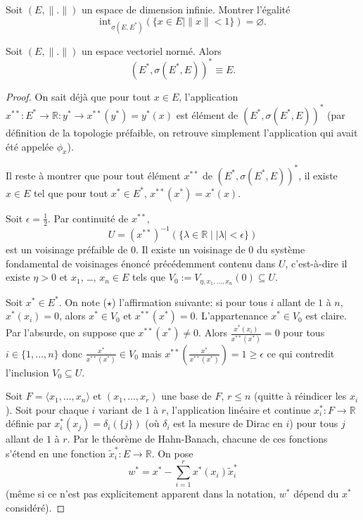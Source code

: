 \begin{exo}
  Soit $(E, \|.\|)$ un espace de dimension infinie. Montrer l'égalité
  $$\mathrm{int}_{\sigma(E, E^*)}(\{x\in E\mid \|x\|<1\})=\varnothing.$$
\end{exo}

\begin{prop}
  Soit $(E, \|.\|)$ un espace vectoriel normé. Alors
  $$(E^*, \sigma(E^*, E))^*\equiv E.$$
\end{prop}
\begin{proof}
  On sait déjà que pour tout $x\in E$, l'application
  $x^{**}: E^*\to \mathbb R: y^*\to x^{**}(y^*) = y^*(x)$ est
  élément de $(E^*, \sigma(E^*, E))^*$ (par définition de la
  topologie préfaible, on retrouve simplement l'application
  qui avait été appelée $\phi_x$).

  Il reste à montrer que pour tout élément $x^{**}$ de
  $(E^*, \sigma(E^*, E))^*$, il existe $x\in E$ tel que
  pour tout $x^*\in E^*$, $x^{**}(x^*) = x^*(x)$.

  Soit $\epsilon=\frac{1}{2}$. Par continuité de $x^{**}$,
  $$U = (x^{**})^{-1}\left(\{\lambda\in\mathbb R\mid
    |\lambda|<\epsilon\}\right)$$
  est un voisinage préfaible de $0$. Il existe un voisinage de $0$ du système
  fondamental de voisinages énoncé précédemment contenu dans $U$, c'est-à-dire
  il existe $\eta > 0$ et $x_1$,
  \ldots, $x_n\in E$ tels que $V_0:=V_{\eta, x_1, \ldots, x_n}(0)\subseteq U$.

  Soit $x^*\in E^*$. On note ($\star$) l'affirmation suivante:
  si pour tous $i$ allant de $1$ à $n$,
  $x^*(x_i) = 0$, alors $x^*\in V_0$ et $x^{**}(x^*) = 0$.
  L'appartenance $x^*\in V_0$ est claire. Par l'absurde,
  on suppose que $x^{**}(x^*)\neq 0$. Alors $\frac{x^*(x_i)}{x^{**}(x^*)}=0$
  pour tous $i\in\{1, \ldots, n\}$ donc $\frac{x^*}{x^{**}(x^*)}\in
  V_0$ mais
  $x^{**}\left( \frac{x^*}{x^{**}(x^*)}\right)=1\geq\epsilon$ ce qui contredit
  l'inclusion $V_0\subseteq U$.

  Soit $F = \langle x_1, \ldots, x_n\rangle$ et $(x_1, \ldots, x_r)$ une base
  de $F$, $r\leq n$ (quitte à réindicer les $x_i$). Soit pour
  chaque $i$ variant de $1$ à $r$, l'application linéaire et continue
  $x^*_i:F\to\mathbb R$  définie par $x^*_i(x_j) =
  \delta_{i}(\{j\})$ (où $\delta_i$ est la mesure de Dirac en $i$) pour tous $j$
  allant de $1$ à $r$.
  Par le théorème de Hahn-Banach, chacune de ces fonctions s'étend
  en une fonction $\widetilde{x}_i^*: E\to \mathbb R$.
  On pose $$w^* = x^* - \sum_{i=1}^rx^*(x_i)\widetilde{x}_i^*$$
  (même si ce n'est pas explicitement apparent dans la notation,
  $w^*$ dépend du $x^*$ considéré).


\end{proof}
